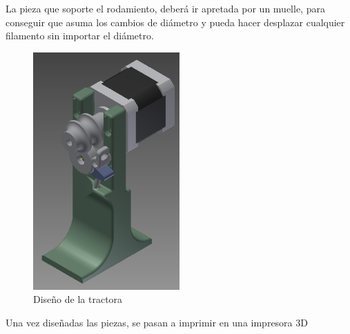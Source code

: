 La pieza que soporte el rodamiento, deberá ir apretada por un muelle, para conseguir que asuma los cambios de diámetro y pueda hacer desplazar cualquier filamento sin importar el diámetro.

\begin{figure}[H]
    \centering
    \includegraphics[width=0.5\textwidth]{images/producciones/tractora/asembli.png}
    \caption{Diseño de la tractora}
    \label{fig:tractora2}
\end{figure}

Una vez diseñadas las piezas, se pasan a imprimir en una impresora 3D


